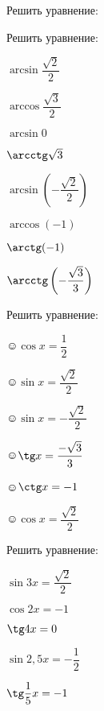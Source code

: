 \begin{listofex}
	\item Решить уравнение:
	\begin{enumcols}[itemcolumns=2]
		\item {}
		\item {}
		\item {}
		\item {}
		\item {}
		\item {}
	\end{enumcols}
	\item Решить уравнение:
	\begin{enumcols}[itemcolumns=4]
		\item \( \arcsin\dfrac{\sqrt{2}}{2} \)
		\item \( \arccos\dfrac{\sqrt{3}}{2} \)
		\item \( \arcsin0 \)
		\item \( \arcctg\sqrt{3} \)
		\item \( \arcsin\left( -\dfrac{\sqrt{2}}{2} \right) \)
		\item \( \arccos\left( -1 \right) \)
		\item \( \arctg(-1) \)
		\item \( \arcctg\left( -\dfrac{\sqrt{3}}{3} \right) \)
	\end{enumcols}
	\item Решить уравнение:
	\begin{enumcols}[itemcolumns=3]
		\item ☺\( \cos x = \dfrac{1}{2} \)
		\item ☺\( \sin x = \dfrac{\sqrt{2}}{2} \)
		\item ☺\( \sin x = -\dfrac{\sqrt{2}}{2} \)
		\item ☺\( \tg x = \dfrac{-\sqrt{3}}{3} \)
		\item ☺\( \ctg x = -1 \)
		\item ☺\( \cos x = \dfrac{\sqrt{2}}{2} \)
	\end{enumcols}
	\item Решить уравнение:
	\begin{enumcols}[itemcolumns=3]
		\item \( \sin 3x = \dfrac{\sqrt{2}}{2} \)
		\item \( \cos 2x = -1 \)
		\item \( \tg 4x = 0 \)
		\item \( \sin 2,5x = -\dfrac{1}{2} \)
		\item \( \tg \dfrac{1}{5}x = -1 \)

\end{enumcols}
\end{listofex}
